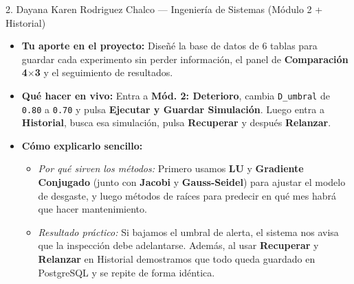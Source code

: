 \documentclass[11pt,a4paper]{article}
\begin{document}
\begin{tarjeta}{2. Dayana Karen Rodriguez Chalco — Ingeniería de Sistemas (Módulo 2 + Historial)}
\begin{itemize}[noitemsep]
    \item \textbf{Tu aporte en el proyecto:} Diseñé la base de datos de 6 tablas para guardar cada experimento sin perder información, el panel de \textbf{Comparación 4$\times$3} y el seguimiento de resultados.
    \item \textbf{Qué hacer en vivo:} Entra a \textbf{Mód. 2: Deterioro}, cambia \texttt{D\_umbral} de \texttt{0.80} a \texttt{0.70} y pulsa \textbf{Ejecutar y Guardar Simulación}. Luego entra a \textbf{Historial}, busca esa simulación, pulsa \textbf{Recuperar} y después \textbf{Relanzar}.
    \item \textbf{Cómo explicarlo sencillo:}
    \begin{itemize}[noitemsep]
        \item \textit{Por qué sirven los métodos:} Primero usamos \textbf{LU} y \textbf{Gradiente Conjugado} (junto con \textbf{Jacobi} y \textbf{Gauss-Seidel}) para ajustar el modelo de desgaste, y luego métodos de raíces para predecir en qué mes habrá que hacer mantenimiento.
        \item \textit{Resultado práctico:} Si bajamos el umbral de alerta, el sistema nos avisa que la inspección debe adelantarse. Además, al usar \textbf{Recuperar} y \textbf{Relanzar} en Historial demostramos que todo queda guardado en PostgreSQL y se repite de forma idéntica.
    \end{itemize}
\end{itemize}
\end{tarjeta}
\end{document}
